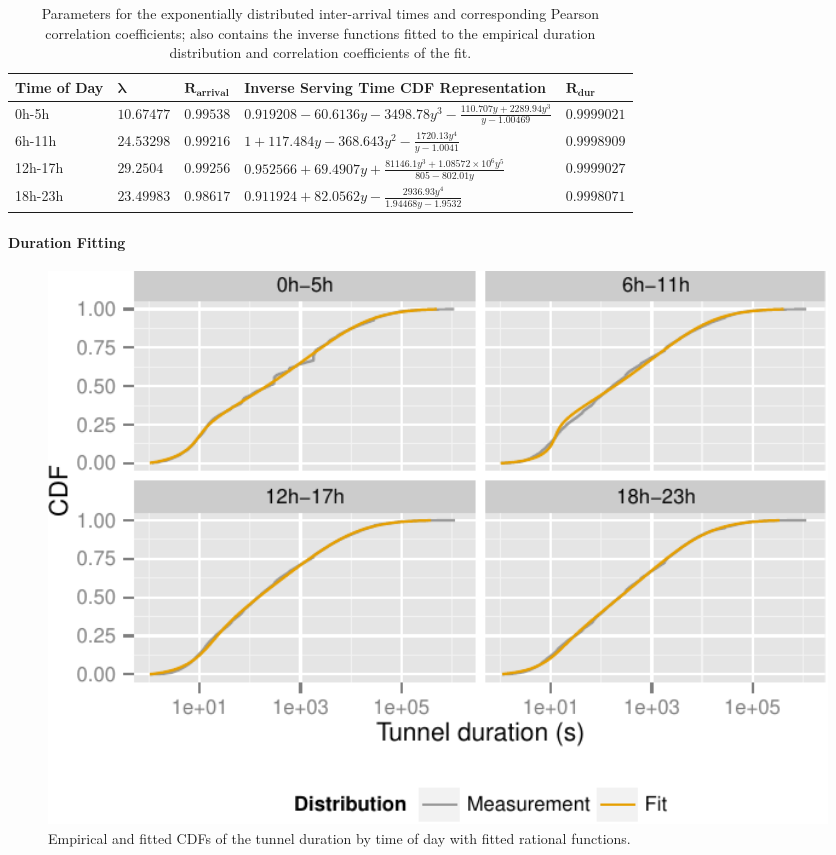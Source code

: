 \begin{table}[htb]
  \caption{Parameters for the exponentially distributed inter-arrival times and corresponding Pearson correlation coefficients; also contains the inverse functions fitted to the empirical duration distribution and correlation coefficients of the fit.}
  \label{c4:tab:fits}
  \tabulinesep=1.2mm
  \centering
\begin{tabu}{X[0.9,l]X[r]X[r]X[4.5,r]X[r]} 
  \toprule
  \textbf{Time of Day} & $\mathbf{\lambda}$ & $\mathbf{R_{arrival}}$ & \textbf{Inverse Serving Time \gls{CDF} Representation} & $\mathbf{R_{dur}}$\\ 
  \midrule
  0h-5h & $10.67477$ & $0.99538$ & $0.919208 - 60.6136y - 3498.78y^3 - \frac{110.707y + 2289.94y^3}{y - 1.00469}$ &  $0.9999021$ \\
  6h-11h & $24.53298$ & $0.99216$ & $1 + 117.484y - 368.643y^2 - \frac{1720.13y^4}{y - 1.0041}$ & $0.9998909$ \\
  12h-17h & $29.2504$ & $0.99256$ & $0.952566 + 69.4907y + \frac{81146.1y^3 + 1.08572\times10^6y^5}{805 - 802.01y}$ & $0.9999027$ \\
  18h-23h & $23.49983$ & $0.98617$ & $0.911924 + 82.0562y - \frac{2936.93y^4}{1.94468y - 1.9532}$ & $0.9998071$ \\
  \bottomrule
\end{tabu}
\end{table}



\paragraph{Duration Fitting}

\begin{figure}[htb]
  \centering
  \includegraphics[width=1.0\textwidth]{images/timeslot-fits.pdf}
  \caption{Empirical and fitted \glspl{CDF} of the tunnel duration by time of day with fitted rational functions.}
  \label{c4:fig:fittedsdurationlots}
\end{figure}

